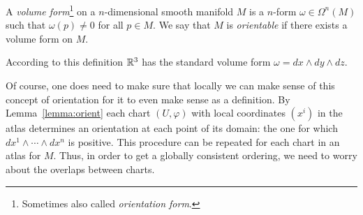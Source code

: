 \begin{definition}
	A \emph{volume form}\footnote{Sometimes also called \emph{orientation form}.} on a $n$-dimensional smooth manifold $M$ is a $n$-form $\omega\in\Omega^n(M)$ such that $\omega(p) \neq 0$ for all $p\in M$.
	We say that $M$ is \emph{orientable} if there exists a volume form on $M$.
\end{definition}

\begin{example}
	According to this definition $\mathbb{R}^3$ has the standard volume form $\omega = dx \wedge dy \wedge dz$.
\end{example}

Of course, one does need to make sure that locally we can make sense of this concept of orientation for it to even make sense as a definition.
By Lemma~\ref{lemma:orient} each chart $(U, \varphi)$ with local coordinates $(x^i)$ in the atlas determines an orientation at each point of its domain: the one for which $dx^1\wedge\cdots\wedge dx^n$ is positive.
This procedure can be repeated for each chart in an atlas for $M$.
Thus, in order to get a globally consistent ordering, we need to worry about the overlaps between charts.

